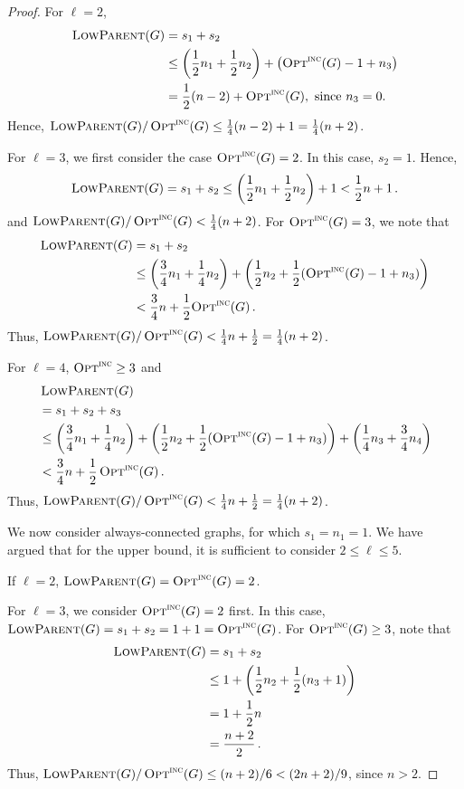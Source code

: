 \begin{proof}
For $\ell = 2$, 
\begin{align*}
\alayersparent(G)
&  = s_1+s_2 \\
&  \leq \left( \frac12 n_1 + \frac12 n_2 \right) + 
       \left( \onopt(G)-1+n_3 \right) \\
&  = \frac12(n-2) + \onopt(G), \text{ since } n_3=0.
\end{align*}
Hence, 
$\alayersparent(G) / \onopt(G) \leq \frac14(n-2) + 1 =
\frac14(n+2)$.

For $\ell=3$, we first consider the case $\onopt(G)=2$.
In this case, $s_2=1$.
Hence, 
$$\alayersparent(G) 
  = s_1 + s_2 
  \leq \left( \frac12 n_1 + \frac12 n_2 \right) + 1 
  < \frac12n +1\,.
$$
and 
$\alayersparent(G) / \onopt(G) < \frac14(n+2)$.
For $\onopt(G)=3$, we note that 
\begin{align*}
\alayersparent(G) 
&  = s_1+s_2\\
&  \leq \left( \frac{3}{4}n_1 + \frac{1}{4}n_2 \right) +
       \left( \frac{1}{2}n_2 + \frac{1}{2}(\onopt(G)-1+n_3) \right) \\
&  < \frac{3}{4}n + \frac12{\onopt(G)}\,.
\end{align*}
Thus, 
$\alayersparent(G) / \onopt(G) < \frac14 n + \frac12 = \frac14(n+2)$.

For $\ell=4$, $\onopt \geq 3$
and
\begin{align*}
&  \alayersparent(G) \\
&  = s_1+s_2+s_3 \\
&  \leq \left( \frac34 n_1 + \frac14 n_2 \right) + 
       \left( \frac12 n_2 + \frac12(\onopt(G)-1+n_3) \right) + 
       \left( \frac14 n_3 + \frac34 n_4 \right) \\
&  < \frac34 n + \frac12 \onopt(G)\,.
\end{align*}
Thus, $\alayersparent(G) / \onopt(G) < \frac14 n + \frac12 = \frac14(n+2)$.

We now consider always-connected graphs, for which $s_1=n_1=1$.
We have argued that for the upper bound, it is sufficient to consider
$2 \leq \ell \leq 5$. 

If $\ell=2$, $\alayersparent(G)=\onopt(G)=2$.

For $\ell=3$, we consider $\onopt(G)=2$ first.
In this case, $\alayersparent(G) = s_1 + s_2 = 1+1 = \onopt(G)$.
For $\onopt(G) \geq 3$, note that 
\begin{align*}
\alayersparent(G) 
&  = s_1+s_2\\
&  \leq 1 + \left( \frac{1}{2}n_2 + \frac12(n_3+1) \right) \\
&  = 1 + \frac12 n\\
&  = \frac{n+2}{2}\,.
\end{align*}
Thus, $\alayersparent(G)/\onopt(G) \leq (n+2)/6 < (2n+2)/9$, since $n > 2$.


\end{proof}
